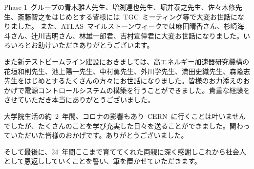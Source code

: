 Phase-1~グループの青木雅人先生、増渕達也先生、堀井泰之先生、佐々木修先生、斎藤智之をはじめとする皆様には~TGC~ミーティング等で大変お世話になりました。
また、ATLAS~マイルストーンウィークでは麻田晴香さん、杉崎海斗さん、辻川吉明さん、林雄一郎君、吉村宣倖君に大変お世話になりました。いろいろとお助けいただきありがとうございます。

また新テストビームライン建設におきましては、高エネルギー加速器研究機構の花垣和則先生、池上陽一先生、中村勇先生、外川学先生、満田史織先生、森隆志先生をはじめとするたくさんの方々にお世話になりました。皆様のお力添えのおかげで電源コントロールシステムの構築を行うことができました。貴重な経験をさせていただき本当にありがとうございました。 

大学院生活の約~2~年間、コロナの影響もあり~CERN~に行くことは叶いませんでしたが、たくさんのことを学び充実した日々を送ることができました。関わっていただいた皆様のおかげです。ありがとうございました。

そして最後に、24~年間ここまで育ててくれた両親に深く感謝しこれから社会人として恩返ししていくことを誓い、筆を置かせていただきます。